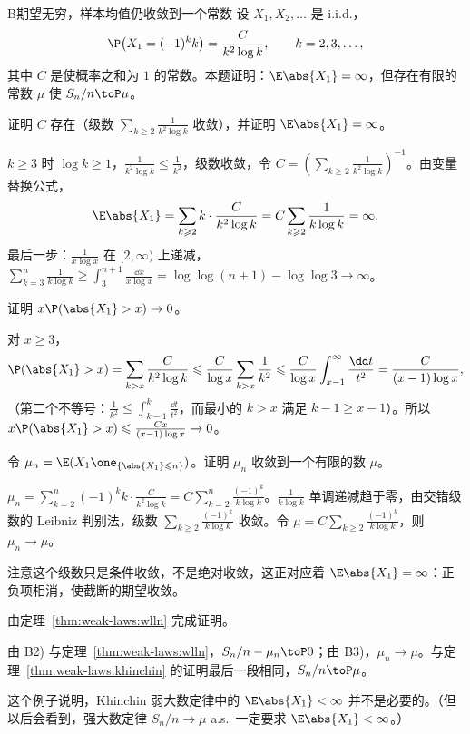 \begin{probleme}{B}{期望无穷，样本均值仍收敛到一个常数}
设 $X_1,X_2,\dots$ 是 i.i.d.，
\[
\P\bigl(X_1=(-1)^kk\bigr)=\frac C{k^2\log k},\qquad k=2,3,\dots,
\]
其中 $C$ 是使概率之和为 $1$ 的常数。本题证明：$\E\abs{X_1}=\infty$，但存在有限的常数 $\mu$ 使 $S_n/n\toP\mu$。
\begin{questions}
\item 证明 $C$ 存在（级数 $\sum_{k\geqslant2}\frac1{k^2\log k}$ 收敛），并证明 $\E\abs{X_1}=\infty$。
\begin{solution}
$k\geqslant3$ 时 $\log k\geqslant1$，$\frac1{k^2\log k}\leqslant\frac1{k^2}$，级数收敛，令 $C=(\sum_{k\geqslant2}\frac1{k^2\log k})^{-1}$。由变量替换公式，
\[
\E\abs{X_1}=\sum_{k\geqslant2}k\cdot\frac C{k^2\log k}=C\sum_{k\geqslant2}\frac1{k\log k}=\infty,
\]
最后一步：$\frac1{x\log x}$ 在 $[2,\infty)$ 上递减，$\sum_{k=3}^n\frac1{k\log k}\geqslant\int_3^{n+1}\frac{\dd x}{x\log x}=\log\log(n+1)-\log\log3\to\infty$。
\end{solution}
\item 证明 $x\P(\abs{X_1}>x)\to0$。
\begin{solution}
对 $x\geqslant3$，
\[
\P(\abs{X_1}>x)=\sum_{k>x}\frac C{k^2\log k}\leqslant\frac C{\log x}\sum_{k>x}\frac1{k^2}\leqslant\frac C{\log x}\int_{x-1}^\infty\frac{\dd t}{t^2}=\frac C{(x-1)\log x},
\]
（第二个不等号：$\frac1{k^2}\leqslant\int_{k-1}^k\frac{\dd t}{t^2}$，而最小的 $k>x$ 满足 $k-1\geqslant x-1$）。所以 $x\P(\abs{X_1}>x)\leqslant\frac{Cx}{(x-1)\log x}\to0$。
\end{solution}
\item 令 $\mu_n=\E(X_1\one_{\{\abs{X_1}\leqslant n\}})$。证明 $\mu_n$ 收敛到一个有限的数 $\mu$。
\begin{solution}
$\mu_n=\sum_{k=2}^n(-1)^kk\cdot\frac C{k^2\log k}=C\sum_{k=2}^n\frac{(-1)^k}{k\log k}$。$\frac1{k\log k}$ 单调递减趋于零，由交错级数的 Leibniz 判别法，级数 $\sum_{k\geqslant2}\frac{(-1)^k}{k\log k}$ 收敛。令 $\mu=C\sum_{k\geqslant2}\frac{(-1)^k}{k\log k}$，则 $\mu_n\to\mu$。

注意这个级数只是条件收敛，不是绝对收敛，这正对应着 $\E\abs{X_1}=\infty$：正负项相消，使截断的期望收敛。
\end{solution}
\item 由定理~\ref{thm:weak-laws:wlln} 完成证明。
\begin{solution}
由 B2) 与定理~\ref{thm:weak-laws:wlln}，$S_n/n-\mu_n\toP0$；由 B3)，$\mu_n\to\mu$。与定理~\ref{thm:weak-laws:khinchin} 的证明最后一段相同，$S_n/n\toP\mu$。

这个例子说明，Khinchin 弱大数定律中的 $\E\abs{X_1}<\infty$ 并不是必要的。（但以后会看到，强大数定律 $S_n/n\to\mu$ a.s.\ 一定要求 $\E\abs{X_1}<\infty$。）
\end{solution}
\end{questions}
\end{probleme}

